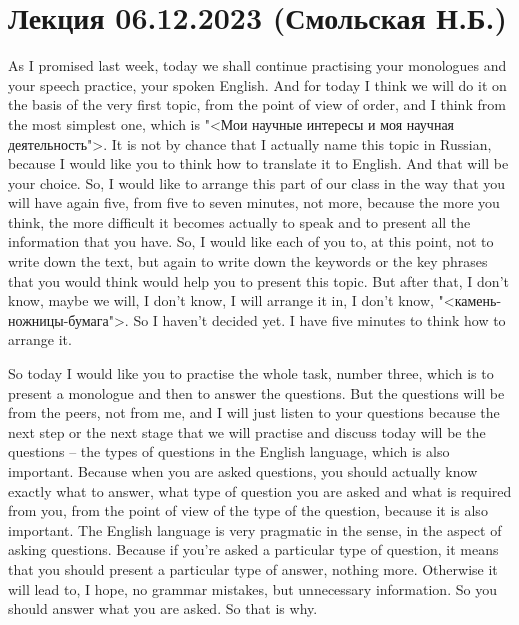 \documentclass[main.tex]{subfiles}
\begin{document}
\section{Лекция 06.12.2023 (Смольская Н.Б.)}

As I promised last week, today we shall continue practising your monologues and your speech practice, your spoken English.
And for today I think we will do it on the basis of the very first topic, from the point of view of order, and I think from the most simplest one, which is "<Мои научные интересы и моя научная деятельность">.
It is not by chance that I actually name this topic in Russian, because I would like you to think how to translate it to English.
And that will be your choice.
So, I would like to arrange this part of our class in the way that you will have again five, from five to seven minutes, not more, because the more you think, the more difficult it becomes actually to speak and to present all the information that you have.
So, I would like each of you to, at this point, not to write down the text, but again to write down the keywords or the key phrases that you would think would help you to present this topic.
But after that, I don't know, maybe we will, I don't know, I will arrange it in, I don't know, "<камень-ножницы-бумага">.
So I haven't decided yet.
I have five minutes to think how to arrange it.

So today I would like you to practise the whole task, number three, which is to present a monologue and then to answer the questions.
But the questions will be from the peers, not from me, and I will just listen to your questions because the next step or the next stage that we will practise and discuss today will be the questions -- the types of questions in the English language, which is also important.
Because when you are asked questions, you should actually know exactly what to answer, what type of question you are asked and what is required from you, from the point of view of the type of the question, because it is also important.
The English language is very pragmatic in the sense, in the aspect of asking questions.
Because if you're asked a particular type of question, it means that you should present a particular type of answer, nothing more.
Otherwise it will lead to, I hope, no grammar mistakes, but unnecessary information.
So you should answer what you are asked.
So that is why.
\end{document}
